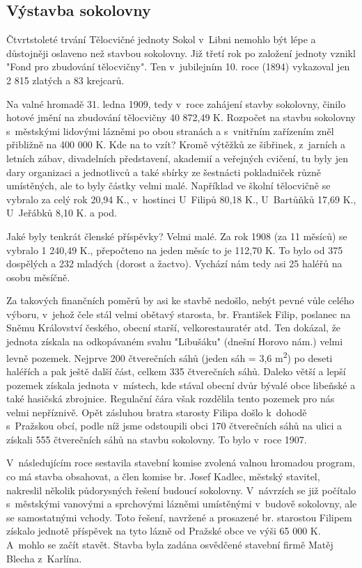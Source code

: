 \documentclass[a5paper, 12pt, twoside]{article}
\begin{document}
\subsection{Výstavba sokolovny}

Čtvrtstoleté trvání Tělocvičné jednoty Sokol v~Libni nemohlo být lépe a
důstojněji oslaveno než stavbou sokolovny. Již třetí rok po založení
jednoty vznikl "Fond pro zbudování tělocvičny". Ten v~jubilejním 10.
roce (1894) vykazoval jen 2 815 zlatých a 83 krejcarů.

Na valné hromadě 31. ledna 1909, tedy v~roce zahájení stavby sokolovny,
činilo hotové jmění na zbudování tělocvičny 40 872,49 K. Rozpočet na
stavbu sokolovny s~městskými lidovými lázněmi po obou stranách a
s~vnitřním zařízením zněl přibližně na 400 000 K. Kde na to vzít? Kromě
výtěžků ze šibřinek, z~jarních a letních zábav, divadelních představení,
akademií a veřejných cvičení, tu byly jen dary organizaci a jednotlivců
a také sbírky ze šestnácti pokladniček různě umístěných, ale to byly
částky velmi malé. Například ve školní tělocvičně se vybralo za celý rok
20,94 K., v~hostinci U~Filipů 80,18 K., U~Bartůňků 17,69 K., U~Jeřábků
8,10 K. a pod.

Jaké byly tenkrát členské příspěvky? Velmi malé. Za rok 1908 (za 11
měsíců) se vybralo 1 240,49 K., přepočteno na jeden měsíc to je 112,70
K. To bylo od 375 dospělých a 232 mladých (dorost a žactvo). Vychází nám
tedy asi 25 haléřů na osobu měsíčně.

Za takových finančních poměrů by asi ke stavbě nedošlo, nebýt pevné vůle
celého výboru, v~jehož čele stál velmi obětavý starosta, br. František
Filip, poslanec na Sněmu Království českého, obecní starší,
velkorestauratér atd. Ten dokázal, že jednota získala na odkopávaném
svahu "Libušáku" (dnešní Horovo nám.) velmi levně pozemek. Nejprve 200
čtverečních sáhů (jeden sáh = 3,6 m\textsuperscript{2}) po deseti
haléřích a pak ještě další část, celkem 335 čtverečních sáhů. Daleko
větší a lepší pozemek získala jednota v~místech, kde stával obecní dvůr
bývalé obce libeňské a také hasičská zbrojnice. Regulační čára však
rozdělila tento pozemek pro nás velmi nepříznivě. Opět zásluhou bratra
starosty Filipa došlo k~dohodě s~Pražskou obcí, podle níž jsme
odstoupili obci 170 čtverečních sáhů na ulici a získali 555 čtverečních
sáhů na stavbu sokolovny. To bylo v~roce 1907.

V~následujícím roce sestavila stavební komise zvolená valnou hromadou
program, co má stavba obsahovat, a člen komise br. Josef Kadlec, městský
stavitel, nakreslil několik půdorysných řešení budoucí sokolovny.
V~návrzích se již počítalo s~městskými vanovými a sprchovými lázněmi
umístěnými v~budově sokolovny, ale se samostatnými vchody. Toto řešení,
navržené a prosazené br. starostou Filipem získalo jednotě příspěvek na
tyto lázně od Pražské obce ve výši 65 000 K. A~mohlo se začít stavět.
Stavba byla zadána osvědčené stavební firmě Matěj Blecha z~Karlína.
\end{document}
